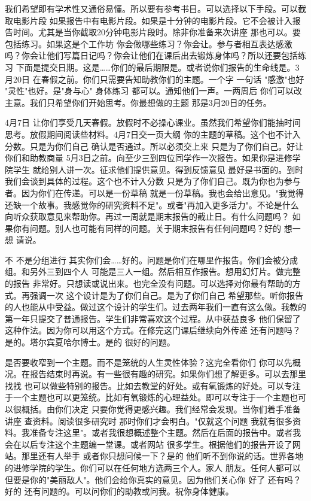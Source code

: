 我们希望即有学术性又通俗易懂。所以要有参考书目。可以选择以下手段。可以截取电影片段 如果报告中有电影片段。如果是十分钟的电影片段。它不会被计入报告时间。尤其是当你截取20分钟电影片段时。除非你准备来次讲座 那也可以。要包括练习。如果这是个工作坊 你会做哪些练习？你会让。参与者相互表达感激吗？你会让他们写篇日记吗？你会让他们在课后出去锻炼身体吗？所以还要包括练习 下面是提交日期。这是……你们的最后期限是。或者说你们报告的生命线是。3月20日 在春假之前。你们只需要告知助教你们的主题。一个字 一句话 "感激"也好 "灵性"也好。是"身与心" 身体练习 都可以。通知他们一声。一两周后 你们可以改主意。我们只希望你们开始思考。你最想做的主题 那是3月20日的任务。 

4月7日 让你们享受几天春假。放假时不必操心课业。虽然我们希望你们能抽时间思考。放假期间阅读些材料。4月7日交一页大纲 你的主题的草稿。这个也不计入分数。只是为你们自己 确认是否通过。所以必须交上来 只是为了你们自己。好让你们和助教商量 5月3日之前。向至少三到四位同学作一次报告。如果你是进修学院学生 就给别人讲一次。征求他们提供意见。得到反馈意见 最好是书面的。到时我们会谈到具体的过程。这个也不计入分数 只是为了你们自己。既为你也为参与者。因为你们在传递。可以是一份草稿 就是一份草稿。我也会给出意见。"我觉得还缺一个故事。我感觉你的研究资料不足"。或者"再加入更多活力"。不论是什么 向听众获取意见来帮助你。再过一周就是期末报告的截止日。有什么问题吗？ 如果你有问题。别人也可能有同样的问题。关于期末报告有任何问题吗？好的 想一想 请说。 

不 不是分组进行 其实你们会……好的。问题是你们在哪里作报告。你们会被分成组。和另外三到四个人 可能是三人一组。然后相互作报告。想用幻灯片。做完整的报告 非常好。只想读或说出来。也完全没有问题。可以选择对你最有帮助的方式。再强调一次 这个设计是为了你们自己。是为了你们自己 希望那些。听你报告的人也能从中受益。做过这个设计的学生们。过去两年我们一直有这么做。我教的第一年只提交了普通报告。学生们非常喜欢这个过程。从中获益良多 他们保留了这种作法。因为你可以用这个方式。在修完这门课后继续向外传递 还有问题吗？ 是的。塔尔宾夏哈尔博士。是的 很好的问题。 

是否要收窄到一个主题。而不是笼统的人生灵性体验？这完全看你们 你可以先概况。在报告结束时再说。有一些很有趣的研究。如果你们想了解更多。可以去那里找找 也可以做些特别的报告。比如去教堂的好处。或有氧锻炼的好处。可以专注于一个主题也可以更笼统。比如有氧锻炼的心理益处。即可以专注于一个主题也可以很概括。由你们决定 只要你觉得更感兴趣。我们经常会发现。当你们着手准备讲座 查资料。阅读很多研究时 那时你们才会明白。"仅就这个问题 我就有很多资料。我准备专注这里"。或者我很想概述整个主题。然后在后面的报告中。或者我会在以后专注这个主题编一堂课。或者网站 很多学生。根据他们的报告开设了网站。那里还有人举手 或者你只想问候一下？是的 他们听不到你说的话。世界各地的进修学院的学生。你们可以在任何地方选两三个人。家人 朋友。任何人都可以 但要是你的"美丽敌人"。他们会给你真实的意见。因为他们关心你 好了 还有吗？好的 还有问题的。可以问你们的助教或问我。祝你身体健康。 

